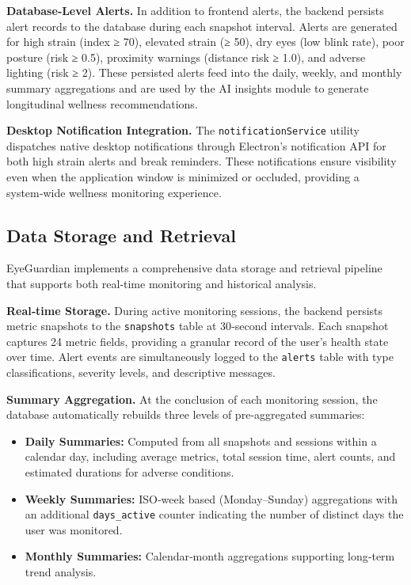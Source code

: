 \documentclass[12pt]{report}
\begin{document}
\textbf{Database‑Level Alerts.} In addition to frontend alerts, the backend persists alert records to the database during each snapshot interval. Alerts are generated for high strain (index ≥ 70), elevated strain (≥ 50), dry eyes (low blink rate), poor posture (risk ≥ 0.5), proximity warnings (distance risk ≥ 1.0), and adverse lighting (risk ≥ 2). These persisted alerts feed into the daily, weekly, and monthly summary aggregations and are used by the AI insights module to generate longitudinal wellness recommendations.

\textbf{Desktop Notification Integration.} The \texttt{notificationService} utility dispatches native desktop notifications through Electron's notification API for both high strain alerts and break reminders. These notifications ensure visibility even when the application window is minimized or occluded, providing a system‑wide wellness monitoring experience.

\subsection{Data Storage and Retrieval}

EyeGuardian implements a comprehensive data storage and retrieval pipeline that supports both real‑time monitoring and historical analysis.

\textbf{Real‑time Storage.} During active monitoring sessions, the backend persists metric snapshots to the \texttt{snapshots} table at 30‑second intervals. Each snapshot captures 24 metric fields, providing a granular record of the user's health state over time. Alert events are simultaneously logged to the \texttt{alerts} table with type classifications, severity levels, and descriptive messages.

\textbf{Summary Aggregation.} At the conclusion of each monitoring session, the database automatically rebuilds three levels of pre‑aggregated summaries:

\begin{itemize}
    \item \textbf{Daily Summaries:} Computed from all snapshots and sessions within a calendar day, including average metrics, total session time, alert counts, and estimated durations for adverse conditions.
    \item \textbf{Weekly Summaries:} ISO‑week based (Monday–Sunday) aggregations with an additional \texttt{days\_active} counter indicating the number of distinct days the user was monitored.
    \item \textbf{Monthly Summaries:} Calendar‑month aggregations supporting long‑term trend analysis.
\end{itemize}
\end{document}
